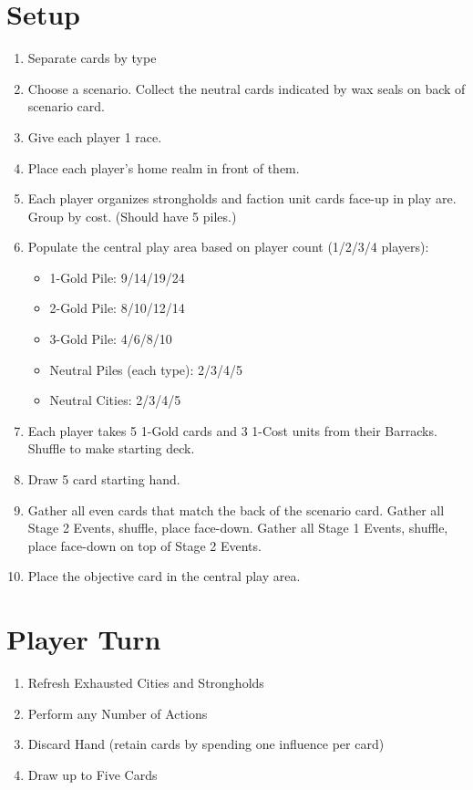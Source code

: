 \documentclass[12pt]{article}
\newenvironment{enumerateCustom}
{\begin{enumerate}
  \setlength{\itemsep}{1pt}
  \setlength{\parskip}{0pt}
  \setlength{\parsep}{0pt}}
{\end{enumerate}}
\newenvironment{itemizeCustom}
{\begin{itemize}
  \setlength{\itemsep}{1pt}
  \setlength{\parskip}{0pt}
  \setlength{\parsep}{0pt}}
{\end{itemize}}
\begin{document}
\begin{multicols*}{2}

\section*{Setup}
\begin{enumerateCustom}
    \item Separate cards by type
    \item Choose a scenario. Collect the neutral cards indicated by wax seals on back of scenario card.
    \item Give each player 1 race.
    \item Place each player's home realm in front of them.
    \item Each player organizes strongholds and faction unit cards face-up in play are. Group by cost. (Should have 5 piles.)
    \item Populate the central play area based on player count (1/2/3/4 players):
        \begin{itemizeCustom}
            \item 1-Gold Pile: 9/14/19/24
            \item 2-Gold Pile: 8/10/12/14
            \item 3-Gold Pile: 4/6/8/10
            \item Neutral Piles (each type): 2/3/4/5
            \item Neutral Cities: 2/3/4/5
        \end{itemizeCustom}
    \item Each player takes 5 1-Gold cards and 3 1-Cost units from their Barracks. Shuffle to make starting deck.
    \item Draw 5 card starting hand.
    \item Gather all even cards that match the back of the scenario card. Gather all Stage 2 Events, shuffle, place face-down. Gather all Stage 1 Events, shuffle, place face-down on top of Stage 2 Events.
    \item Place the objective card in the central play area.
\end{enumerateCustom}

\section*{Player Turn}
\begin{enumerateCustom}
    \item Refresh Exhausted Cities and Strongholds
    \item Perform any Number of Actions
    \item Discard Hand (retain cards by spending one influence per card)
    \item Draw up to Five Cards
\end{enumerateCustom}


\end{multicols*}
\end{document}
